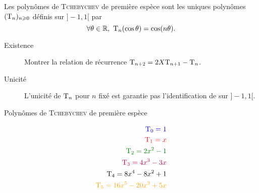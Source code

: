 \begin{defi}
    Les polynômes de \textsc{Tchebychev} de première espèce sont les uniques polynômes $(\mathrm{T}_n)_{n \geqslant 0}$ définis sur $]-1, 1[$ par
    $$\forall \theta \in \mathbb{R},\ \mathrm{T}_n (\cos \theta) = \cos(n \theta).$$
\end{defi}

\begin{elem_preuve}
    \begin{description}
        \item[Existence] Montrer la relation de récurrence $\mathrm{T}_{n+2} = 2X \mathrm{T}_{n+1} - \mathrm{T}_n$. 
        \item[Unicité] L'unicité de $\mathrm{T}_n$ pour $n$ fixé est garantie pas l'identification de  sur $]-1, 1[$. 
    \end{description}
\end{elem_preuve}


\begin{marginfigure}[-8.5cm]
    \centering
	
	\caption*{\centering Polynômes de \textsc{Tchebychev} de première espèce}
	\begin{align*}
	   	\color{blue} \Tcheby_0 = 1 \\
    	\color{red} \Tcheby_1 = x \\
    	\color{green} \Tcheby_2 = 2x^2-1 \\
    	\color{purple} \Tcheby_3 = 4x^3-3x \\
    	\color{black} \Tcheby_4 = 8x^4-8x^2+1 \\
    	\color{orange} \Tcheby_5 = 16x^5-20x^3+5x
	\end{align*}
\end{marginfigure}
